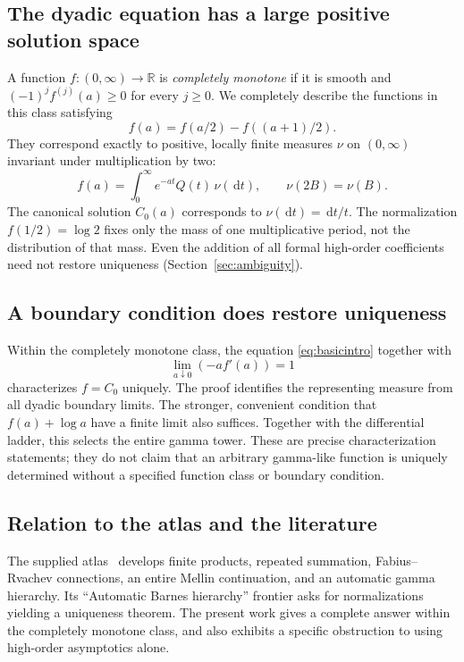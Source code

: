 \documentclass[11pt,letterpaper]{article}
\numberwithin{equation}{section}
\theoremstyle{definition}
\theoremstyle{remark}
\newcommand{\R}{\mathbb R}
\newcommand{\dd}{\,\mathrm d}
\begin{document}
\subsection{The dyadic equation has a large positive solution space}
A function $f:(0,\infty)\to\R$ is \emph{completely monotone} if it is smooth
and $(-1)^j f^{(j)}(a)\ge0$ for every $j\ge0$.
We completely describe the functions in this class satisfying
\begin{equation}\label{eq:basicintro}
 f(a)=f(a/2)-f((a+1)/2).
\end{equation}
They correspond exactly to positive, locally finite measures $\nu$ on
$(0,\infty)$ invariant under multiplication by two:
\begin{equation}\label{eq:classintro}
 f(a)=\int_0^\infty e^{-at}Q(t)\,\nu(\dd t),
 \qquad \nu(2B)=\nu(B).
\end{equation}
The canonical solution $C_0(a)$ corresponds to $\nu(\dd t)=\dd t/t$.
The normalization $f(1/2)=\log2$ fixes only the mass of one multiplicative
period, not the distribution of that mass. Even the addition of all formal
high-order coefficients need not restore uniqueness
(Section~\ref{sec:ambiguity}).

\subsection{A boundary condition does restore uniqueness}
Within the completely monotone class, the equation
\eqref{eq:basicintro} together with
\begin{equation}\label{eq:boundaryintro}
 \lim_{a\downarrow0}(-a f'(a))=1
\end{equation}
characterizes $f=C_0$ uniquely. The proof identifies the representing
measure from all dyadic boundary limits. The stronger, convenient condition
that $f(a)+\log a$ have a finite limit also suffices.
Together with the differential ladder, this selects the entire gamma tower.
These are precise characterization statements; they do not claim that an
arbitrary gamma-like function is uniquely determined without a specified
function class or boundary condition.

\subsection{Relation to the atlas and the literature}\label{subsec:provenance}
The supplied atlas~\cite{Atlas} develops finite products, repeated summation,
Fabius--Rvachev connections, an entire Mellin continuation, and an automatic
gamma hierarchy. Its ``Automatic Barnes hierarchy'' frontier asks for
normalizations yielding a uniqueness theorem. The present work gives a
complete answer within the completely monotone class, and also exhibits a
specific obstruction to using high-order asymptotics alone.
\end{document}
